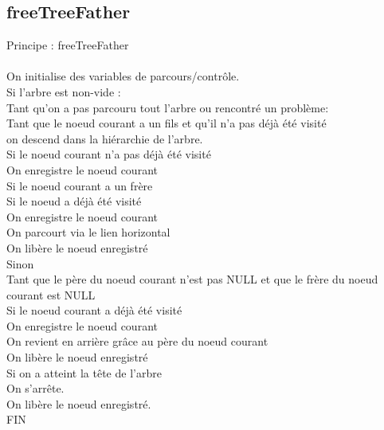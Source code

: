 \documentclass[a4paper]{article}
\newcommand\tab[1][1cm]{\hspace*{#1}}
\begin{document}


\subsection{freeTreeFather}
\begin{algorithm}
Principe : freeTreeFather
\\
\\
\tab On initialise des variables de parcours/contrôle.
\\
\tab Si l'arbre est non-vide :
\\
\tab \tab \tab Tant qu'on a pas parcouru tout l'arbre ou rencontré un problème:
\\
\tab \tab \tab \tab Tant que le noeud courant a un fils et qu'il n'a pas déjà été visité
\\
\tab \tab \tab \tab \tab on descend dans la hiérarchie de l'arbre.
\\
\tab \tab \tab \tab Si le noeud courant n'a pas déjà été visité
\\
\tab \tab \tab \tab \tab On enregistre le noeud courant
\\
\tab \tab \tab \tab Si le noeud courant a un frère
\\
\tab \tab \tab \tab \tab Si le noeud a déjà été visité
\\
\tab \tab \tab \tab \tab \tab On enregistre le noeud courant
\\
\tab \tab \tab \tab \tab On parcourt via le lien horizontal
\\
\tab \tab \tab \tab \tab On libère le noeud enregistré
\\
\tab \tab \tab \tab Sinon
\\
\tab \tab \tab \tab Tant que le père du noeud courant n'est pas NULL et que le frère du noeud 
\\
\tab \tab \tab \tab courant est NULL
\\
\tab \tab \tab \tab \tab Si le noeud courant a déjà été visité
\\
\tab \tab \tab \tab \tab \tab On enregistre le noeud courant
\\
\tab \tab \tab \tab \tab On revient en arrière grâce au père du noeud courant
\\
\tab \tab \tab \tab \tab On libère le noeud enregistré
\\
\tab \tab \tab \tab Si on a atteint la tête de l'arbre
\\
\tab \tab \tab \tab \tab On s'arrête.
\\
\tab On libère le noeud enregistré.
\\
FIN
\end{algorithm}
\end{document}
